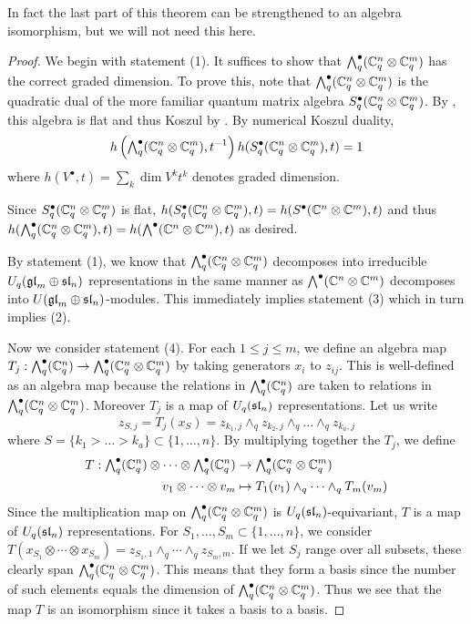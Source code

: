 \documentclass[11pt]{amsart}
\begin{document}
In fact the last part of this theorem can be strengthened to an algebra isomorphism, but we will not need this here.

\begin{proof}
We begin with statement (1). It suffices to show that $ \Alt{\bullet}{q}(\bC_q^n \otimes \bC_q^m) $   has the correct graded dimension.  To prove this, note that $\Alt{\bullet}{q}(\bC_q^n \otimes \bC_q^m) $ is the quadratic dual of the more familiar quantum matrix algebra $ S_q^\bullet (\bC_q^n \otimes \bC_q^m) $.  By \cite[Prop. 2.33]{BZ}, this algebra is flat and thus Koszul by \cite[Prop. 2.28]{BZ}. By numerical Koszul duality,
$$ h\left(\Alt{\bullet}{q}( \bC_q^n \otimes \bC_q^m), t^{-1}\right) h(S^\bullet_q (\bC_q^n \otimes \bC_q^m), t) = 1 $$
where $ h(V^\bullet, t) = \sum_k \dim V^k t^k $ denotes graded dimension.

Since $ S^\bullet_q (\bC_q^n \otimes \bC_q^m) $ is flat, $ h(S^\bullet_q (\bC_q^n \otimes \bC_q^m), t) =  h(S^\bullet (\bC^n \otimes \bC^m), t) $ and thus  $ h(\Alt{\bullet}{q} (\bC_q^n \otimes \bC_q^m), t) =  h(\Alt{\bullet}{} (\bC^n \otimes \bC^m), t)$ as desired.

By statement (1), we know that $ \Alt{\bullet}{q}(\bC_q^n \otimes \bC_q^m) $ decomposes into irreducible $ U_q(\gl_m \oplus \sl_n) $ representations in the same manner as $ \Alt{\bullet}{}(\bC^n \otimes \bC^m) $ decomposes into $ U(\gl_m \oplus \sl_n)$-modules. This immediately implies statement (3) which in turn implies (2).

Now we consider statement (4). For each $ 1 \le j \le m$, we define an algebra map $T_j : \Alt{\bullet}{q}(\bC_q^n) \rightarrow \Alt{\bullet}{q} (\bC_q^n \otimes \bC_q^m) $ by taking generators $ x_i $ to $z_{ij}$.  This is well-defined as an algebra map because the relations in $ \Alt{\bullet}{q}(\bC_q^n) $ are taken to relations in $\Alt{\bullet}{q} (\bC_q^n \otimes \bC_q^m)$.  Moreover $T_j $ is a map of $ U_q(\sl_n) $ representations.  Let us write
$$z_{S,j} = T_j(x_S) = z_{k_1,j} \wedge_q z_{k_2,j} \wedge_q \dots \wedge_q z_{k_a,j}$$
where $ S = \{k_1 > \dots > k_a \} \subset \{ 1, \dots, n \} $. By multiplying together the $ T_j $, we define
\begin{align*}
T : \Alt{\bullet}{q}(\bC_q^n) \otimes \cdots \otimes \Alt{\bullet}{q}(\bC_q^n) &\rightarrow \Alt{\bullet}{q} (\bC_q^n \otimes \bC_q^m) \\
v_1 \otimes \cdots \otimes v_m &\mapsto T_1(v_1) \wedge_q \cdots \wedge_q T_m(v_m)
\end{align*}
Since the multiplication map on $\Alt{\bullet}{q} (\bC_q^n \otimes \bC_q^m)  $ is $U_q(\sl_n)$-equivariant, $ T $ is a map of $ U_q(\sl_n) $ representations. For $ S_1, \dots, S_m \subset \{1, \dots, n \} $, we consider $ T(x_{S_1} \otimes \cdots \otimes x_{S_m}) = z_{S_1,1} \wedge_q \cdots \wedge_q z_{S_m,m}$. If we let $ S_j $ range over all subsets, these clearly span $ \Alt{\bullet}{q} (\bC_q^n \otimes \bC_q^m) $.  This means that they form a basis since the number of such elements equals the dimension of $ \Alt{\bullet}{q} (\bC_q^n \otimes \bC_q^m) $.  Thus we see that the map $ T $ is an isomorphism since it takes a basis to a basis.
\end{proof}
\end{document}
